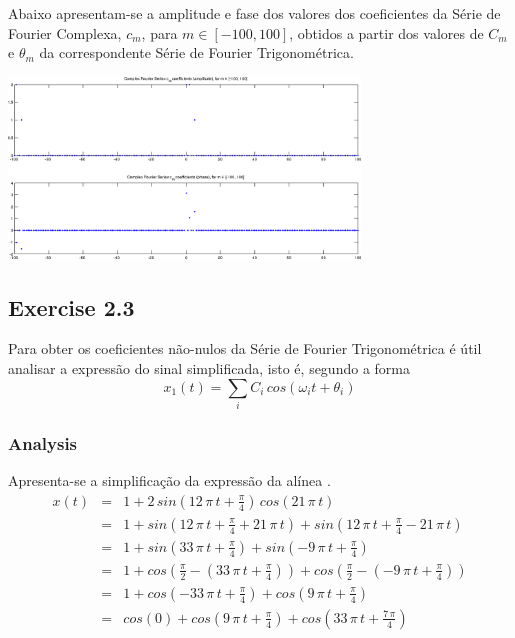 \documentclass[a4paper]{article}
\begin{document}
\noindent Abaixo apresentam-se a amplitude e fase dos valores dos coeficientes da Série de Fourier Complexa, $c_m$, para $m \in [-100, 100]$, obtidos a partir dos valores de $C_m$ e $\theta_m$ da correspondente Série de Fourier Trigonométrica.
\begin{center}
	\includegraphics[width=0.70\textwidth]{images/ex2_2_4_complex_cm.png}
	\label{fig:ex2_2_4_complex_cm}
\end{center}

\subsection{Exercise 2.3}
\noindent Para obter os coeficientes não-nulos da Série de Fourier Trigonométrica é útil analisar a expressão do sinal simplificada, isto é, segundo a forma
\begin{equation}
x_{1}(t) = \sum_{i} C_{i} \, cos(\omega_{i} t + \theta_{i})
\end{equation}

\subsubsection{ Analysis}
\noindent Apresenta-se a simplificação da expressão da alínea \emph{}.
\begin{eqnarray}
	x(t) & = & 1 + 2 \, sin\left(12 \, \pi \, t + \frac{\pi}{4}\right) \, cos(21 \, \pi \, t) \\
	& = & 1 + sin\left(12 \, \pi \, t + \frac{\pi}{4} + 21 \, \pi \, t\right) + sin\left(12 \, \pi \, t + \frac{\pi}{4} - 21 \, \pi \, t\right) \\
	& = & 1 + sin\left(33 \, \pi \, t + \frac{\pi}{4}\right) + sin\left(-9 \, \pi \, t + \frac{\pi}{4}\right) \\
	& = & 1 + cos\left(\frac{\pi}{2} - \left(33 \, \pi \, t + \frac{\pi}{4}\right)\right) + cos\left(\frac{\pi}{2} - \left(-9 \, \pi \, t + \frac{\pi}{4}\right)\right) \\
	& = & 1 + cos\left(- 33 \, \pi \, t + \frac{\pi}{4}\right) + cos\left(9 \, \pi \, t + \frac{\pi}{4}\right) \\
	& = & cos(0) + cos\left(9 \, \pi \, t + \frac{\pi}{4}\right) + cos\left(33 \, \pi \, t + \frac{7 \, \pi}{4}\right)
\end{eqnarray}
\end{document}
